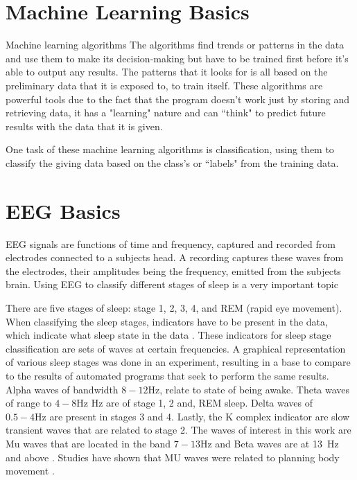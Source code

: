 \documentclass[conference,compsoc]{IEEEtran}
\begin{document}
\section{Machine Learning Basics}
Machine learning algorithms 
The algorithms find trends or patterns in the data and use them to make its decision-making but have to be trained first before it's able to output any results. 
The patterns that it looks for is all based on the preliminary data that it is exposed to, to train itself. These algorithms are powerful tools due to the fact that 
the program doesn't work just by storing and retrieving data, it has a "learning" nature and can ``think" to predict future results with the data that it is given.

One task of these machine learning algorithms is classification, using them to classify the giving data based on the class's or ``labels" from the training data. 

\section{EEG Basics}
EEG signals are functions of time and frequency, captured and recorded from electrodes connected to a subjects head. A recording captures these waves from the electrodes, their amplitudes being the frequency, emitted from the subjects brain.  
Using EEG to classify different stages of sleep is a very important topic %

There are five stages of sleep:  stage 1, 2, 3, 4, and REM (rapid eye movement). When classifying the sleep stages, indicators 
have to be present in the data, which indicate what sleep state in the data \cite{auto}. These indicators for sleep stage classification are sets of waves at certain frequencies. A graphical representation of various sleep stages was done in an experiment, resulting in a base to compare to the results of automated programs that seek to perform the same results. Alpha waves of bandwidth $8-12\si{\hertz}$, relate to state of being awake. Theta waves of range to $4-8\si{\hertz}$ Hz are of stage 1, 2 and, REM sleep.  Delta waves of $0.5-4\si{\hertz}$ are present in stages 3 and 4. Lastly, the K complex indicator are slow transient waves that are related to stage 2.  The waves of interest in this work are Mu waves that are located in the band $7 - 13\si{\hertz}$ and Beta waves are at \SI{13}{\hertz} and above \cite{classsvm}. Studies have shown that MU waves were related to planning body movement \cite{classsvm}.
\end{document}
